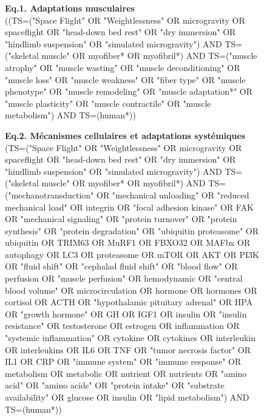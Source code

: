 \documentclass[11pt]{report}
\begin{document}
\begin{figure}[h!]
	\centering
	
	\begin{tcolorbox}[colback=gray!3,colframe=gray!50, width=0.95\textwidth]
		
		\footnotesize
		
		\textbf{Eq.1. Adaptations musculaires} \\
		((TS=("Space Flight" OR "Weightlessness" OR microgravity OR spaceflight OR "head-down bed rest" OR "dry immersion" OR "hindlimb suspension" OR "simulated microgravity")
		AND TS=("skeletal muscle" OR myofiber* OR myofibril*)
		AND TS=("muscle atrophy" OR "muscle wasting" OR "muscle deconditioning" OR "muscle loss" OR "muscle weakness" OR "fiber type" OR "muscle phenotype" OR "muscle remodeling" OR "muscle adaptation*" OR "muscle plasticity" OR "muscle contractile" OR "muscle metabolism")
		AND TS=(human*))
		
		\vspace{0.5em}
		
		\textbf{Eq.2. Mécanismes cellulaires et adaptations systémiques} \\
		(TS=("Space Flight" OR "Weightlessness" OR microgravity OR spaceflight OR "head-down bed rest" OR "dry immersion" OR "hindlimb suspension" OR "simulated microgravity")
		AND TS=("skeletal muscle" OR myofiber* OR myofibril*)
		AND TS=("mechanotransduction" OR "mechanical unloading" OR "reduced mechanical load" OR integrin OR "focal adhesion kinase" OR FAK OR "mechanical signaling" OR "protein turnover" OR "protein synthesis" OR "protein degradation" OR "ubiquitin proteasome" OR ubiquitin OR TRIM63 OR MuRF1 OR FBXO32 OR MAFbx OR autophagy OR LC3 OR proteasome OR mTOR OR AKT OR PI3K
		OR "fluid shift" OR "cephalad fluid shift" OR "blood flow" OR perfusion OR "muscle perfusion" OR hemodynamic OR "central blood volume" OR microcirculation
		OR hormone OR hormones OR cortisol OR ACTH OR "hypothalamic pituitary adrenal" OR HPA OR "growth hormone" OR GH OR IGF1 OR insulin OR "insulin resistance" OR testosterone OR estrogen
		OR inflammation OR "systemic inflammation" OR cytokine OR cytokines OR interleukin OR interleukins OR IL6 OR TNF OR "tumor necrosis factor" OR IL1 OR CRP OR "immune system" OR "immune response"
		OR metabolism OR metabolic OR nutrient OR nutrients OR "amino acid" OR "amino acids" OR "protein intake" OR "substrate availability" OR glucose OR insulin OR "lipid metabolism")
		AND TS=(human*))
		
		\vspace{0.5em}
		

\end{tcolorbox}
\end{figure}
\end{document}
